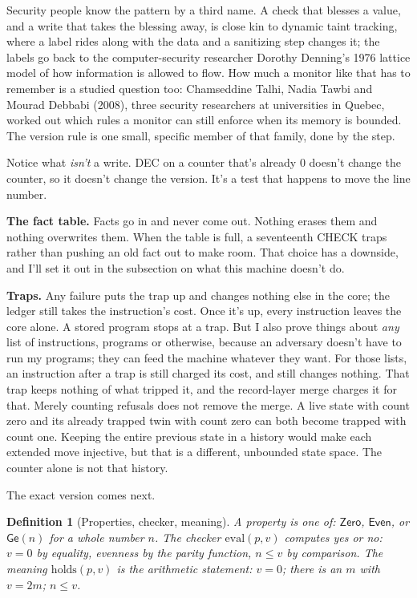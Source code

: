 \documentclass[11pt,twoside]{article}
\theoremstyle{thielethm}
\theoremstyle{thieledef}
\newtheorem{definition}{Definition}[section]
\theoremstyle{thieledef}
\theoremstyle{thieledef}
\theoremstyle{thielethm}
\theoremstyle{thieleobs}
\theoremstyle{thielethm}
\begin{document}
Security people know the pattern by a third name. A check that blesses a value, and a write
that takes the blessing away, is close kin to dynamic taint tracking, where a label rides along
with the data and a sanitizing step changes it; the labels go back to the computer-security
researcher Dorothy Denning's 1976
lattice model of how information is allowed to flow. How much a monitor like that has to
remember is a studied question too: Chamseddine Talhi, Nadia Tawbi and Mourad Debbabi (2008),
three security researchers at universities in Quebec,
worked out which rules a monitor can still enforce when its memory is bounded. The version rule
is one small, specific member of that family, done by the step.

Notice what \emph{isn't} a write. DEC on a counter that's already 0 doesn't change the counter, so
it doesn't change the version. It's a test that happens to move the line number.

\textbf{The fact table.} Facts go in and never come out. Nothing erases them and nothing
overwrites them. When the table is full, a seventeenth CHECK traps rather than pushing an old fact out to
make room. That choice has a downside, and I'll set it out in the
subsection on what this machine doesn't do.

\textbf{Traps.} Any failure puts the trap up and changes nothing else in the core; the ledger
still takes the instruction's cost. Once it's up, every
instruction leaves the core alone. A stored program stops at a trap. But I also prove
things about \emph{any} list of instructions, programs or otherwise, because an adversary doesn't
have to run my programs; they can feed the machine whatever they want. For those lists, an instruction after a trap is still charged its cost, and still changes nothing. That trap keeps nothing of what tripped it, and the record-layer merge charges it for that. Merely counting refusals does not remove the merge. A live state with
count zero and its already trapped twin with count zero can both become
trapped with count one. Keeping the entire previous state in a history
would make each extended move injective, but that is a different, unbounded
state space. The counter alone is not that history.

The exact version comes next.

\begin{definition}[Properties, checker, meaning]\label{def:u34-props}
A \emph{property} is one of: $\mathsf{Zero}$, $\mathsf{Even}$, or $\mathsf{Ge}(n)$ for a whole
number $n$. The \emph{checker} $\mathrm{eval}(p, v)$ computes yes or no: $v = 0$ by equality,
evenness by the parity function, $n \le v$ by comparison. The \emph{meaning} $\mathrm{holds}(p,
v)$ is the arithmetic statement: $v = 0$; there is an $m$ with $v = 2m$; $n \le v$.
\end{definition}
\end{document}
